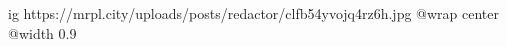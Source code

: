  
 
 
 
 

\ifcmt
  ig https://mrpl.city/uploads/posts/redactor/clfb54yvojq4rz6h.jpg
  @wrap center
  @width 0.9
\fi
